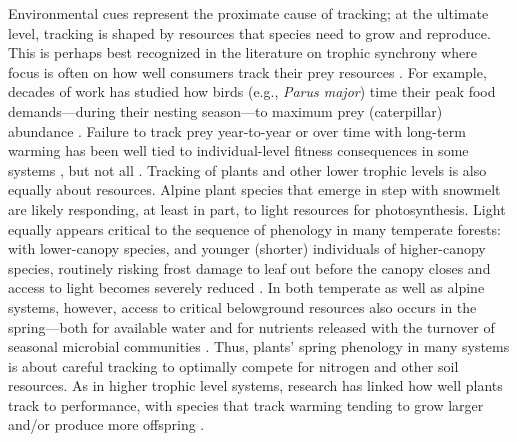\documentclass[11pt,letterpaper]{article}
\begin{document}
Environmental cues represent the proximate cause of tracking; at the ultimate level, tracking is shaped by resources that species need to grow and reproduce. This is perhaps best recognized in the literature on trophic synchrony where focus is often on how well consumers track their prey resources \citep{deacy2018,kharouba2018}. For example, decades of work has studied how birds (e.g., \emph{Parus major}) time their peak food demands---during their nesting season---to maximum prey (caterpillar) abundance \citep[e.g.,][]{charm2008}. Failure to track prey year-to-year or over time with long-term warming has been well tied to individual-level fitness consequences in some systems \citep{charm2008}, but not all \citep{visser2006}. Tracking of plants and other lower trophic levels is also equally about resources. Alpine plant species that emerge in step with snowmelt are likely responding, at least in part, to light resources for photosynthesis. Light equally appears critical to the sequence of phenology in many temperate forests: with lower-canopy species, and younger (shorter) individuals of higher-canopy species, routinely risking frost damage to leaf out before the canopy closes and access to light becomes severely reduced \citep{Vitasse2013,heberling2019}. In both temperate as well as alpine systems, however, access to critical belowground resources also occurs in the spring---both for available water and for nutrients released with the turnover of seasonal microbial communities \citep{Zak:1990ar,edwards2010N}. Thus, plants' spring phenology in many systems is about careful tracking to optimally compete for nitrogen and other soil resources. As in higher trophic level systems, research has linked how well plants track to performance, with species that track warming tending to grow larger and/or produce more offspring \citep{Cleland:2012}.
\end{document}
